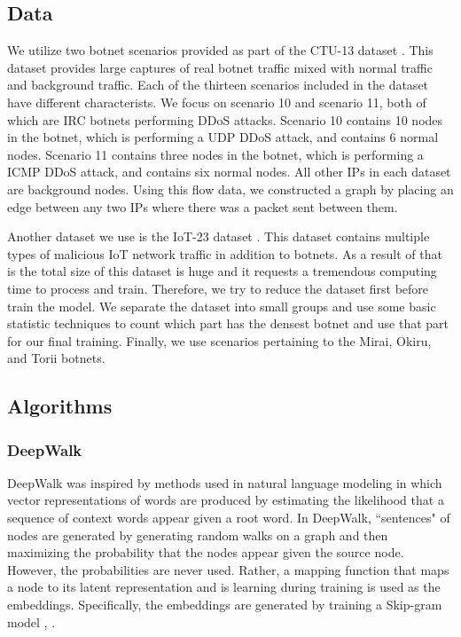 \documentclass[10pt]{article}
\begin{document}
\begin{multicols}{2}
\subsection{Data}
We utilize two botnet scenarios provided as part of the CTU-13 dataset \cite{Garcia}. This dataset provides large captures of real botnet traffic mixed with normal traffic and background traffic. Each of the thirteen scenarios included in the dataset have different characterists. We focus on scenario 10 and scenario 11, both of which are IRC botnets performing DDoS attacks. Scenario 10 contains 10 nodes in the botnet, which is performing a UDP DDoS attack, and contains 6 normal nodes. Scenario 11 contains three nodes in the botnet, which is performing a ICMP DDoS attack, and contains six normal nodes. All other IPs in each dataset are background nodes. Using this flow data, we constructed a graph by placing an edge between any two IPs where there was a packet sent between them. 

Another dataset we use is the IoT-23 dataset \cite{IoT-23}. This dataset contains multiple types of malicious IoT network traffic in addition to botnets. As a result of that is the total size of this dataset is huge and it requests a tremendous computing time to process and train. Therefore, we try to reduce the dataset first before train the model. We separate the dataset into small groups and use some basic statistic techniques to count which part has the densest botnet and use that part for our final training. Finally, we use scenarios pertaining to the Mirai, Okiru, and Torii botnets. 

\subsection{Algorithms}
 \subsubsection{DeepWalk}
DeepWalk \cite{Perozzi} was inspired by methods used in natural language modeling in which vector representations of words are produced by estimating the likelihood that a sequence of context words appear given a root word. In DeepWalk, ``sentences" of nodes are generated by generating random walks on a graph and then maximizing the probability that the nodes appear given the source node. However, the probabilities are never used. Rather, a mapping function that maps a node to its latent representation and is learning during training is used as the embeddings. Specifically, the embeddings are generated by training a Skip-gram model \cite{Mikolov}, \cite{Perozzi}.


\end{multicols}
\end{document}
